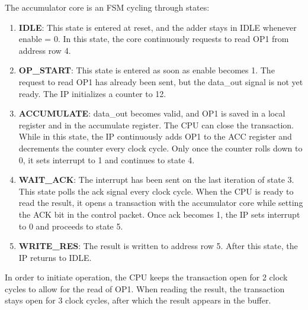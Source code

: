 The accumulator core is an FSM cycling through states:
\begin{enumerate}

\item \textbf{IDLE}: This state is entered at reset, and the adder stays in IDLE whenever enable = 0. In this state, the core continuously requests to read OP1 from address row 4.

\item \textbf{OP\_START}: This state is entered as soon as enable becomes 1. The request to read OP1 has already been sent, but the data\_out signal is not yet ready. The IP initializes a counter to 12. 

\item \textbf{ACCUMULATE}: data\_out becomes valid, and OP1 is saved in a local register and in the accumulate register. The CPU can close the transaction.
While in this state, the IP continuously adds OP1 to the ACC register and decrements the counter every clock cycle. Only once the counter rolls down to 0, it sets interrupt to 1 and continues to state 4.

\item \textbf{WAIT\_ACK}: The interrupt has been sent on the last iteration of state 3. This state polls the ack signal every clock cycle. 
When the CPU is ready to read the result, it opens a transaction with the accumulator core while setting the ACK bit in the control packet. Once ack becomes 1, the IP sets interrupt to 0 and proceeds to state 5.

\item\textbf{ WRITE\_RES}: The result is written to address row 5. After this state, the IP returns to IDLE.

\end{enumerate}
In order to initiate operation, the CPU keeps the transaction open for 2 clock cycles to allow for the read of OP1. When reading the result, the transaction stays open for 3 clock cycles, after which the result appears in the buffer.